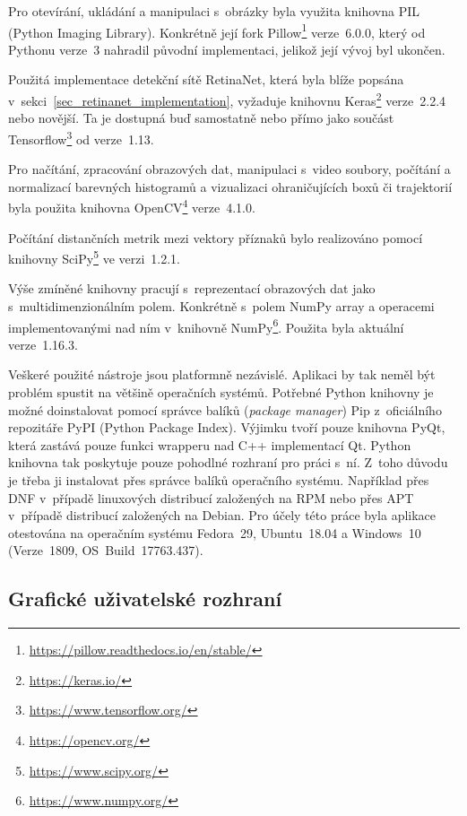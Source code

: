 Pro otevírání, ukládání a manipulaci s~obrázky byla využita knihovna PIL (Python Imaging Library). Konkrétně její fork Pillow\footnote{\url{https://pillow.readthedocs.io/en/stable/}} verze~6.0.0, který od Pythonu verze~3 nahradil původní implementaci, jelikož její vývoj byl ukončen.

Použitá implementace detekční sítě RetinaNet, která byla blíže popsána v~sekci~\ref{sec_retinanet_implementation}, vyžaduje knihovnu Keras\footnote{\url{https://keras.io/}} verze~2.2.4 nebo novější. Ta je dostupná buď samostatně nebo přímo jako součást Tensorflow\footnote{\url{https://www.tensorflow.org/}} od verze~1.13.

Pro načítání, zpracování obrazových dat, manipulaci s~video soubory, počítání a normalizací barevných histogramů a vizualizaci ohraničujících boxů či trajektorií byla použita knihovna OpenCV\footnote{\url{https://opencv.org/}} verze~4.1.0.

Počítání distančních metrik mezi vektory příznaků bylo realizováno pomocí knihovny SciPy\footnote{\url{https://www.scipy.org/}} ve verzi~1.2.1.

Výše zmíněné knihovny pracují s~reprezentací obrazových dat jako s~multidimenzionálním polem. Konkrétně s~polem NumPy array a operacemi implementovanými nad ním v~knihovně NumPy\footnote{\url{https://www.numpy.org/}}. Použita byla aktuální verze~1.16.3.

Veškeré použité nástroje jsou platformně nezávislé. Aplikaci by tak neměl být problém spustit na většině operačních systémů. Potřebné Python knihovny je možné doinstalovat pomocí správce balíků (\textit{package manager}) Pip z~oficiálního repozitáře PyPI (Python Package Index). Výjimku tvoří pouze knihovna PyQt, která zastává pouze funkci wrapperu nad C++ implementací Qt. Python knihovna tak poskytuje pouze pohodlné rozhraní pro práci s~ní. Z~toho důvodu je třeba ji instalovat přes správce balíků operačního systému. Například přes DNF v~případě linuxových distribucí založených na RPM nebo přes APT v~případě distribucí založených na Debian. Pro účely této práce byla aplikace otestována na operačním systému Fedora~29, Ubuntu~18.04 a Windows~10 (Verze~1809, OS~Build~17763.437).


\subsection*{Grafické uživatelské rozhraní}

